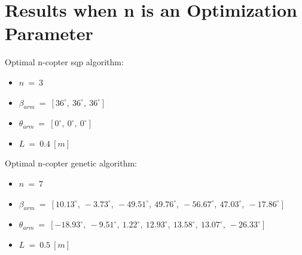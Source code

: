 \begin{table}[!h]
  \begin{center}
   \caption{Comparison between all the different optimal designs' hover capabilities.}\vspace{1ex}
   \label{tab:tab_all_compare_hover}
  \end{center}
\end{table}

\section{Results when n is an Optimization Parameter}
\label{sec:result_n}

Optimal n-copter sqp algorithm:
\begin{itemize}
  \item $n\ =\ 3$
  \item $\beta_{arm}\ =\ [36^{\circ},\  36^{\circ},\  36^{\circ}]$
  \item $\theta_{arm}\ =\ [0^{\circ},\  0^{\circ},\  0^{\circ}]$
  \item $L\ =\ 0.4\ [m]$
\end{itemize}

Optimal n-copter genetic algorithm:
\begin{itemize}
  \item $n\ =\ 7$
  \item $\beta_{arm}\ =\ [10.13^{\circ},\  -3.73^{\circ},\  -49.51^{\circ},\  49.76^{\circ},\
                          -56.67^{\circ},\  47.03^{\circ},\  -17.86^{\circ}]$
  \item $\theta_{arm}\ =\ [-18.93^{\circ},\  -9.51^{\circ},\  1.22^{\circ},\  12.93^{\circ},\  13.58^{\circ},\
                            13.07^{\circ},\  -26.33^{\circ}]$
  \item $L\ =\ 0.5\ [m]$
\end{itemize}

